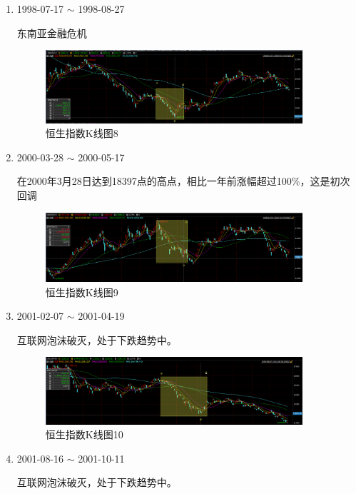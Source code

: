 \documentclass[12pt,a4paper]{article}
\begin{document}
\begin{enumerate}
	\item 1998-07-17 $\sim$ 1998-08-27 
	
	东南亚金融危机
		\begin{figure}[H]
		\centering
		\includegraphics[width=0.9\textwidth]{img/38.png}%
		\caption{恒生指数K线图8}
	\end{figure}		
	
	\item 2000-03-28 $\sim$ 2000-05-17
	
	在2000年3月28日达到18397点的高点，相比一年前涨幅超过100\%，这是初次回调
	
	\begin{figure}[H]
		\centering
		\includegraphics[width=0.9\textwidth]{img/39.png}%
		\caption{恒生指数K线图9}
	\end{figure}	
	
	\item 2001-02-07 $\sim$ 2001-04-19
	
	互联网泡沫破灭，处于下跌趋势中。
		\begin{figure}[H]
		\centering
		\includegraphics[width=0.9\textwidth]{img/40.png}%
		\caption{恒生指数K线图10}
	\end{figure}
	
	\item 2001-08-16 $\sim$ 2001-10-11
		
	互联网泡沫破灭，处于下跌趋势中。


\end{enumerate}
\end{document}
